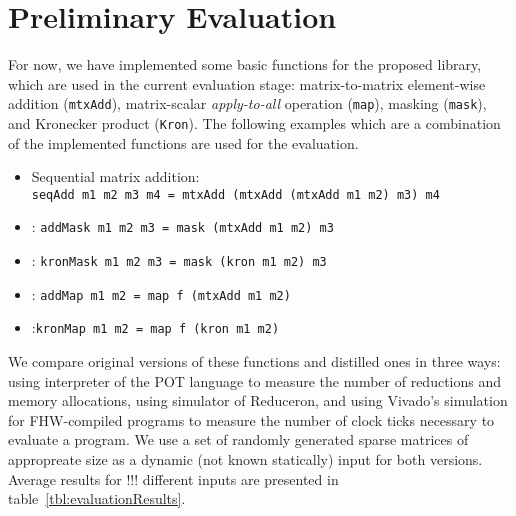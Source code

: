 \section{Preliminary Evaluation}

For now, we have implemented some basic functions for the proposed library, which are used in the current evaluation stage: matrix-to-matrix element-wise addition (\verb|mtxAdd|),
matrix-scalar \emph{apply-to-all} operation (\verb|map|),
masking (\verb|mask|), and Kronecker product (\verb|Kron|).
The following examples which are a combination of the implemented functions are used for the evaluation.

\begin{itemize}
\item Sequential matrix addition:\\
  \verb|seqAdd m1 m2 m3 m4 = mtxAdd (mtxAdd (mtxAdd m1 m2) m3) m4|
\item {}: \verb|addMask m1 m2 m3 = mask (mtxAdd m1 m2) m3|
\item {}: \verb|kronMask m1 m2 m3 = mask (kron m1 m2) m3 |  
\item {}: \verb|addMap m1 m2 = map f (mtxAdd m1 m2)|  
\item {}:\verb|kronMap m1 m2 = map f (kron m1 m2)|  
\end{itemize}
We compare original versions of these functions and distilled ones in three ways: using interpreter of the POT language to measure the number of reductions and memory allocations, using simulator of Reduceron, and using Vivado's simulation for FHW-compiled programs to measure the number of clock ticks necessary to evaluate a program.
We use a set of randomly generated sparse matrices of appropreate size as a dynamic (not known statically) input for both versions.
Average results for !!! different inputs are presented in table~\ref{tbl:evaluationResults}. 

